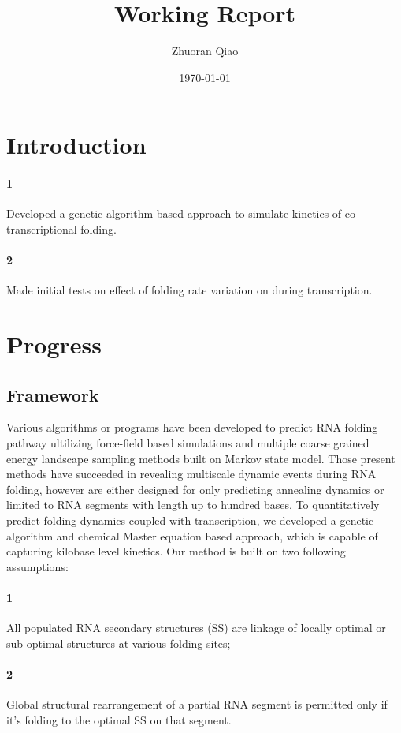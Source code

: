 \documentclass[11pt, a4paper]{article}
\begin{document}
\title{Working Report}
\author{Zhuoran Qiao}
\date{\today}

\maketitle

\section{Introduction}

\paragraph{1} Developed a genetic algorithm based approach to simulate kinetics of co-transcriptional folding.
\paragraph{2} Made initial tests on effect of folding rate variation on during transcription.


\section{Progress}
\subsection{Framework}
Various algorithms or programs have been developed to predict RNA folding pathway ultilizing force-field based simulations and multiple coarse grained energy landscape sampling methods built on Markov state model. Those present methods have succeeded in revealing multiscale dynamic events during RNA folding, however are either designed for only predicting
annealing dynamics or limited to RNA segments with length up to hundred bases. To quantitatively predict folding dynamics coupled with transcription,
we developed a genetic algorithm and chemical Master equation based approach, which is capable of capturing kilobase level kinetics.
 Our method is built on two following assumptions:
\paragraph{1} All populated RNA secondary structures (SS) are linkage of locally optimal or sub-optimal structures at various folding sites;
\paragraph{2} Global structural rearrangement of a partial RNA segment is permitted only if it's folding to the optimal SS on that segment.
\\
\end{document}
